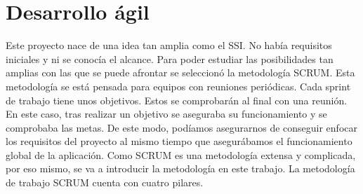 \section{Desarrollo ágil}
Este proyecto nace de una idea tan amplia como el SSI. No había requisitos iniciales y ni se conocía el alcance. Para poder estudiar las posibilidades tan amplias con las que se puede afrontar se seleccionó la metodología SCRUM. Esta metodología se está pensada para equipos con reuniones periódicas. Cada sprint de trabajo tiene unos objetivos. Estos se comprobarán al final con una reunión.
En este caso, tras realizar un objetivo se aseguraba su funcionamiento y se comprobaba las metas. De este modo, podíamos asegurarnos de conseguir enfocar los requisitos del proyecto al mismo tiempo que asegurábamos el funcionamiento global de la aplicación.
Como SCRUM es una metodología extensa y complicada, por eso mismo, se va a introducir la metodología en este trabajo.
La metodología de trabajo SCRUM cuenta con cuatro pilares.
